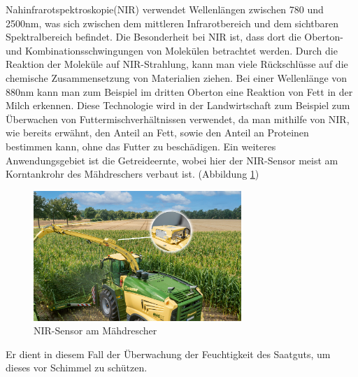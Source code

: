 Nahinfrarotspektroskopie(NIR) verwendet Wellenlängen zwischen 780 und 2500nm,
was sich zwischen dem mittleren Infrarotbereich und dem sichtbaren
Spektralbereich befindet. Die Besonderheit bei NIR ist, dass dort die
Oberton-und Kombinationsschwingungen von Molekülen betrachtet werden.
\cite{shenk2001application} Durch die Reaktion der Moleküle auf NIR-Strahlung,
kann man viele Rückschlüsse auf die chemische Zusammensetzung von Materialien
ziehen. Bei einer Wellenlänge von 880nm kann man zum Beispiel im dritten
Oberton eine Reaktion von Fett in der Milch erkennen. \cite{cen2007theory}
Diese Technologie wird in der Landwirtschaft zum Beispiel zum Überwachen von
Futtermischverhältnissen verwendet, da man mithilfe von NIR, wie bereits
erwähnt, den Anteil an Fett, sowie den Anteil an Proteinen bestimmen kann, ohne
das Futter zu beschädigen. Ein weiteres Anwendungsgebiet ist die Getreideernte,
wobei hier der NIR-Sensor meist am Korntankrohr des Mähdreschers verbaut ist.
(Abbildung \ref{fig:Mähhdrescher NIR-Sensor}) 

\begin{figure}[ht]
	\centering
	\includegraphics[width=0.7\textwidth]{bilder/Krone NIR Control dual.jpg}
	\caption[Mähhdrescher mit NIR-Sensor]{NIR-Sensor am Mähdrescher\cite{Krone}}
	\label{fig:Mähhdrescher NIR-Sensor}
\end{figure}

Er dient in diesem Fall der Überwachung der Feuchtigkeit des Saatguts,
um dieses vor Schimmel zu schützen.